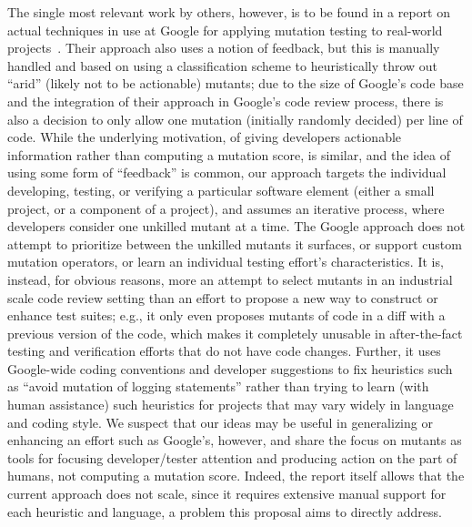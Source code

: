 The single most relevant work by others, however, is to be found in a
report on actual techniques in use at Google for applying mutation
testing to real-world projects~\cite{MutGoogle}.  Their approach also
uses a notion of feedback, but this is manually handled and based on
using a classification scheme to heuristically throw out ``arid''
(likely not to be actionable)
mutants; due to the size of Google's code base and the integration of
their approach in Google's code review process, there is also a
decision to only allow one mutation (initially randomly decided) per
line of code.  While the underlying motivation, of giving developers
actionable information rather than computing a mutation score, is
similar, and the idea of using some form of ``feedback'' is common,
our approach targets the individual developing, testing, or verifying a particular software
element (either a small project, or a component of a project), and
assumes an iterative process, where developers consider one unkilled
mutant at a time.  The Google approach does not attempt to prioritize
between the unkilled mutants it surfaces, or support custom mutation
operators, or learn an individual testing effort's characteristics.
It is, instead, for obvious reasons, more an attempt to select mutants
in an industrial scale code review setting than an effort to propose a
new way to construct or enhance test suites; e.g., it only even
proposes mutants of code in a diff with a previous version of the
code, which makes it completely unusable in after-the-fact testing and
verification efforts that do not have code changes.  Further, it uses
Google-wide coding conventions and developer suggestions to fix
heuristics such as ``avoid mutation of logging statements'' rather
than trying to learn (with human assistance) such heuristics for
projects that may vary widely in language and coding style.  We
suspect that our ideas may be useful in generalizing or enhancing an
effort such as Google's, however, and share the focus on mutants as
tools for focusing developer/tester attention and producing action on the
part of humans, not computing a mutation score.  Indeed, the report
itself allows that the current approach does not scale, since it
requires extensive manual support for each heuristic and language, a
problem this proposal aims to directly address.

